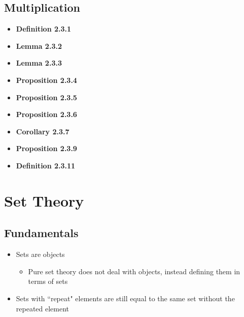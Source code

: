 \documentclass[11pt]{article}
\begin{document}
\subsection{Multiplication}

\begin{itemize}
  \item \textbf{Definition 2.3.1}
  \item \textbf{Lemma 2.3.2}
  \item \textbf{Lemma 2.3.3}
  \item \textbf{Proposition 2.3.4}
  \item \textbf{Proposition 2.3.5}
  \item \textbf{Proposition 2.3.6}
  \item \textbf{Corollary 2.3.7}
  \item \textbf{Proposition 2.3.9}
  \item \textbf{Definition 2.3.11}
\end{itemize}

\section{Set Theory}

\subsection{Fundamentals}
\begin{itemize}
  \item Sets are objects
  \begin{itemize}
    \item Pure set theory does not deal with objects, instead defining them in terms of sets
  \end{itemize}
  \item Sets with ``repeat" elements are still equal to the same set without the repeated element
\end{itemize}
\end{document}
